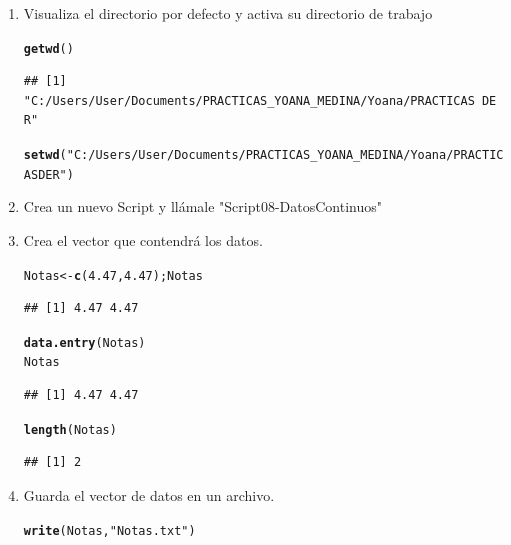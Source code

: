 \documentclass[12pt,letterpaper]{article}\usepackage[]{graphicx}\usepackage[]{color}
\makeatletter
\newcommand{\hlnum}[1]{\textcolor[rgb]{0.686,0.059,0.569}{#1}}%
\newcommand{\hlstr}[1]{\textcolor[rgb]{0.192,0.494,0.8}{#1}}%
\newcommand{\hlstd}[1]{\textcolor[rgb]{0.345,0.345,0.345}{#1}}%
\newcommand{\hlkwb}[1]{\textcolor[rgb]{0.69,0.353,0.396}{#1}}%
\newcommand{\hlkwd}[1]{\textcolor[rgb]{0.737,0.353,0.396}{\textbf{#1}}}%
\newenvironment{kframe}{%
 \def\at@end@of@kframe{}%
 \ifinner\ifhmode%
  \def\at@end@of@kframe{\end{minipage}}%
  \begin{minipage}{\columnwidth}%
 \fi\fi%
 \def\FrameCommand##1{\hskip\@totalleftmargin \hskip-\fboxsep
 \colorbox{shadecolor}{##1}\hskip-\fboxsep
     \hskip-\linewidth \hskip-\@totalleftmargin \hskip\columnwidth}%
 \MakeFramed {\advance\hsize-\width
   \@totalleftmargin\z@ \linewidth\hsize
   \@setminipage}}%
 {\par\unskip\endMakeFramed%
 \at@end@of@kframe}
\newenvironment{knitrout}{}{} %
\makeatother
\begin{document}
\begin{enumerate}
  
\item Visualiza el directorio por defecto y activa su directorio de trabajo
\begin{knitrout}
\color{fgcolor}\begin{kframe}
\begin{alltt}
\hlkwd{getwd}\hlstd{()}
\end{alltt}
\begin{verbatim}
## [1] "C:/Users/User/Documents/PRACTICAS_YOANA_MEDINA/Yoana/PRACTICAS DE R"
\end{verbatim}
\begin{alltt}
\hlkwd{setwd}\hlstd{(}\hlstr{"C:/Users/User/Documents/PRACTICAS_YOANA_MEDINA/Yoana/PRACTICAS DE R"}\hlstd{)}
\end{alltt}
\end{kframe}
\end{knitrout}

\item Crea un nuevo Script y ll\'amale "Script08-DatosContinuos" 

\item  Crea el vector que contendr\'a los datos.
\begin{knitrout}
\color{fgcolor}\begin{kframe}
\begin{alltt}
\hlstd{Notas} \hlkwb{<-} \hlkwd{c}\hlstd{(}\hlnum{4.47}\hlstd{,} \hlnum{4.47}\hlstd{); Notas}
\end{alltt}
\begin{verbatim}
## [1] 4.47 4.47
\end{verbatim}
\begin{alltt}
\hlkwd{data.entry}\hlstd{(Notas)}
\hlstd{Notas}
\end{alltt}
\begin{verbatim}
## [1] 4.47 4.47
\end{verbatim}
\begin{alltt}
\hlkwd{length}\hlstd{(Notas)}
\end{alltt}
\begin{verbatim}
## [1] 2
\end{verbatim}
\end{kframe}
\end{knitrout}

\item Guarda el vector de datos en un archivo.
\begin{knitrout}
\color{fgcolor}\begin{kframe}
\begin{alltt}
\hlkwd{write}\hlstd{(Notas,} \hlstr{"Notas.txt"}\hlstd{)}
\end{alltt}
\end{kframe}
\end{knitrout}


\end{enumerate}
\end{document}
